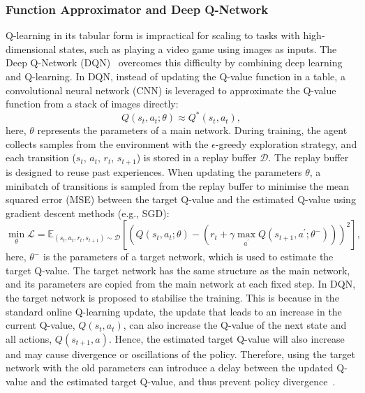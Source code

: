 \subsubsection{Function Approximator and Deep Q-Network}
Q-learning in its tabular form is impractical for scaling to tasks with high-dimensional states, such as playing a video game using images as inputs. The Deep Q-Network (DQN)~\cite{mnih2015human} overcomes this difficulty by combining deep learning and Q-learning. In DQN, instead of updating the Q-value function in a table, a convolutional neural network (CNN) is leveraged to approximate the Q-value function from a stack of images directly:
\begin{equation}
    Q(s_{t},a_{t};\theta) \approx Q^{*}(s_{t},a_{t}),
\end{equation}
here, $\theta$ represents the parameters of a main network. During training, the agent collects samples from the environment with the $\epsilon$-greedy exploration strategy, and each transition ($s_{t}$, $a_{t}$, $r_{t}$, $s_{t+1}$) is stored in a replay buffer $\mathcal{D}$. The replay buffer is designed to reuse past experiences. When updating the parameters $\theta$, a minibatch of transitions is sampled from the replay buffer to minimise the mean squared error (MSE) between the target Q-value and the estimated Q-value using gradient descent methods (e.g., SGD):
\begin{equation}
    \min_{\theta}\mathcal{L} = \mathbb{E}_{(s_{t}, a_{t}, r_{t}, s_{t+1})\sim\mathcal{D}}[(Q(s_{t}, a_{t};\theta) - (r_{t} + \gamma\max_{a^{\prime}}Q(s_{t+1}, a^{\prime};\theta^{-})))^{2}],
\end{equation}
here, $\theta^{-}$ is the parameters of a target network, which is used to estimate the target Q-value. The target network has the same structure as the main network, and its parameters are copied from the main network at each fixed step. In DQN, the target network is proposed to stabilise the training. This is because in the standard online Q-learning update, the update that leads to an increase in the current Q-value, $Q(s_{t}, a_{t})$, can also increase the Q-value of the next state and all actions, $Q(s_{t+1}, a)$. Hence, the estimated target Q-value will also increase and may cause divergence or oscillations of the policy. Therefore, using the target network with the old parameters can introduce a delay between the updated Q-value and the estimated target Q-value, and thus prevent policy divergence~\cite{mnih2015human}.
\newpage

